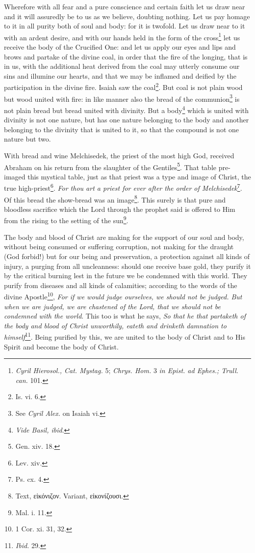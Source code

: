 Wherefore with all fear and a pure conscience and certain faith let us draw near and it will assuredly be to us as we believe, doubting nothing. Let us pay homage to it in all purity both of soul and body: for it is twofold. Let us draw near to it with an ardent desire, and with our hands held in the form of the cross\footnote{\emph{Cyril Hierosol., Cat. Mystag. }5; \emph{Chrys. Hom. }3 \emph{in Epist. ad Ephes.; Trull. can. }101.} let us receive the body of the Crucified One: and let us apply our eyes and lips and brows and partake of the divine coal, in order that the fire of the longing, that is in us, with the additional heat derived from the coal may utterly consume our sins and illumine our hearts, and that we may be inflamed and deified by the participation in the divine fire. Isaiah saw the coal\footnote{Is. vi. 6.}. But coal is not plain wood but wood united with fire: in like manner also the bread of the communion\footnote{See \emph{Cyril Alex. }on Isaiah vi.} is not plain bread but bread united with divinity. But a body\footnote{\emph{Vide Basil, ibid}.} which is united with divinity is not one nature, but has one nature belonging to the body and another belonging to the divinity that is united to it, so that the compound is not one nature but two.

With bread and wine Melchisedek, the priest of the most high God, received Abraham on his return from the slaughter of the Gentiles\footnote{Gen. xiv. 18.}. That table pre-imaged this mystical table, just as that priest was a type and image of Christ, the true high-priest\footnote{Lev. xiv.}. \emph{For thou art a priest for ever after the order of Melchisedek}\footnote{Ps. cx. 4.}. Of this bread the show-bread was an image\footnote{Text, \textgreek{εἰκόνιζον}. Variant, \textgreek{εἰκονίζουσι}.}. This surely is that pure and bloodless sacrifice which the Lord through the prophet said is offered to Him from the rising to the setting of the sun\footnote{Mal. i. 11.}.

The body and blood of Christ are making for the support of our soul and body, without being consumed or suffering corruption, not making for the draught (God forbid!) but for our being and preservation, a protection against all kinds of injury, a purging from all uncleanness: should one receive base gold, they purify it by the critical burning lest in the future we be condemned with this world. They purify from diseases and all kinds of calamities; according to the words of the divine Apostle\footnote{1 Cor. xi. 31, 32.}, \emph{For if we would judge ourselves, we should not be judged. But when we are judged, we are chastened of the Lord, that we should not be condemned with the world}. This too is what he says, \emph{So that he that partaketh of the body and blood of Christ unworthily, eateth and drinketh damnation to himself}\footnote{\emph{Ibid.} 29.}. Being purified by this, we are united to the body of Christ and to His Spirit and become the body of Christ.

